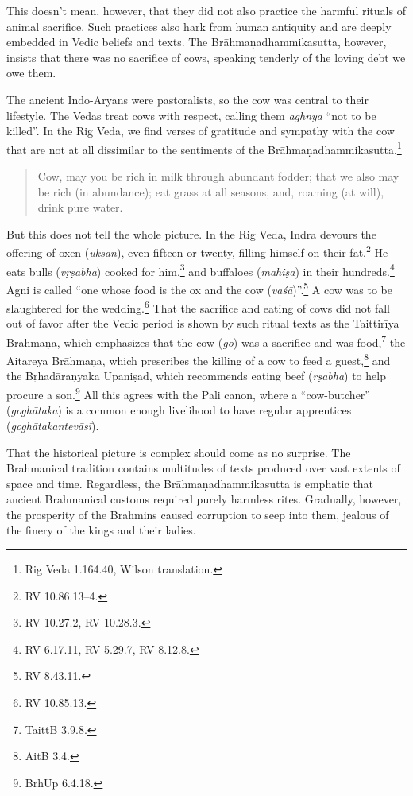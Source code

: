 \documentclass[12pt,openany]{book}%
\begin{document}
This doesn’t mean, however, that they did not also practice the harmful rituals of animal sacrifice. Such practices also hark from human antiquity and are deeply embedded in Vedic beliefs and texts. The \textsanskrit{Brāhmaṇadhammikasutta}, however, insists that there was no sacrifice of cows, speaking tenderly of the loving debt we owe them.

The ancient Indo-Aryans were pastoralists, so the cow was central to their lifestyle. The Vedas treat cows with respect, calling them \textit{aghnya} “not to be killed”. In the Rig Veda, we find verses of gratitude and sympathy with the cow that are not at all dissimilar to the sentiments of the \textsanskrit{Brāhmaṇadhammikasutta}.\footnote{Rig Veda 1.164.40, Wilson translation. }

\begin{quotation}%
Cow, may you be rich in milk through abundant fodder; that we also may be rich (in abundance); eat grass at all seasons, and, roaming (at will), drink pure water.

%
\end{quotation}

But this does not tell the whole picture. In the Rig Veda, Indra devours the offering of oxen (\textit{\textsanskrit{ukṣan}}), even fifteen or twenty, filling himself on their fat.\footnote{RV 10.86.13–4. } He eats bulls (\textit{\textsanskrit{vṛṣa}̱bha}) cooked for him,\footnote{RV 10.27.2, RV 10.28.3. } and buffaloes (\textit{\textsanskrit{mahiṣa}}) in their hundreds.\footnote{RV 6.17.11, RV 5.29.7, RV 8.12.8. } Agni is called “one whose food is the ox and the cow (\textit{\textsanskrit{vaśā}})”.\footnote{RV 8.43.11. } A cow was to be slaughtered for the wedding.\footnote{RV 10.85.13. } That the sacrifice and eating of cows did not fall out of favor after the Vedic period is shown by such ritual texts as the \textsanskrit{Taittirīya} \textsanskrit{Brāhmaṇa}, which emphasizes that the cow (\textit{go}) was a sacrifice and was food,\footnote{TaittB 3.9.8. } the Aitareya \textsanskrit{Brāhmaṇa}, which prescribes the killing of a cow to feed a guest,\footnote{AitB 3.4. } and the \textsanskrit{Bṛhadāraṇyaka} \textsanskrit{Upaniṣad}, which recommends eating beef (\textit{\textsanskrit{rṣabha}}) to help procure a son.\footnote{BrhUp 6.4.18. } All this agrees with the Pali canon, where a “cow-butcher” (\textit{\textsanskrit{goghātaka}}) is a common enough livelihood to have regular apprentices (\textit{\textsanskrit{goghātakantevāsī}}).

That the historical picture is complex should come as no surprise. The Brahmanical tradition contains multitudes of texts produced over vast extents of space and time. Regardless, the \textsanskrit{Brāhmaṇadhammikasutta} is emphatic that ancient Brahmanical customs required purely harmless rites. Gradually, however, the prosperity of the Brahmins caused corruption to seep into them, jealous of the finery of the kings and their ladies.
\end{document}
